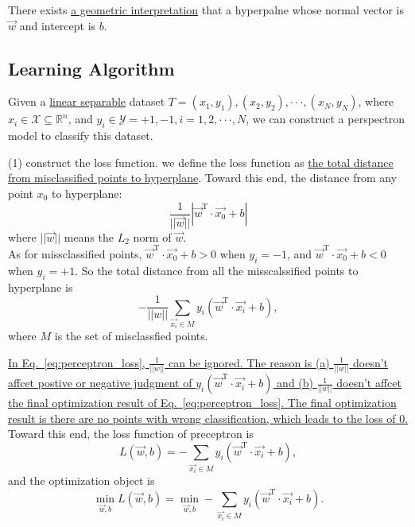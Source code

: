 \documentclass[10pt,onecolumn]{book}
\begin{document}
There exists \uline{a geometric interpretation} that a hyperpalne whose normal vector is $\vec{w}$ and intercept is $b$.

\subsection{Learning Algorithm}
Given a \uline{linear separable} dataset $T = {(x_{1}, y_{1}), (x_{2}, y_{2}), \cdot \cdot \cdot, (x_{N}, y_{N})}$, where $x_{i} \in \mathcal{X} \subseteq \mathbb{R}^n$, and $y_{i} \in \mathcal{Y} = {+1, -1}, i = 1, 2, \cdot \cdot \cdot, N$, we can construct a perspectron model to classify this dataset. 

(1) construct the loss function. we define the loss function as \uline{the total distance from misclassified points to hyperplane}. Toward this end, the distance from any point $x_{0}$ to hyperplane:
\begin{equation}
\frac{1}{||\vec{w}||} |\vec{w}^\mathrm{T}  \cdot \vec{x_{0}} + b|
\end{equation}
where ${||\vec{w}||}$ means the $L_{2}$ norm of $\vec{w}$.\\
\indent As for missclassified points, $\vec{w}^\mathrm{T}  \cdot \vec{x_{0}} + b > 0$ when $y_{i}=-1$, and $\vec{w}^\mathrm{T}  \cdot \vec{x_{0}} + b < 0$ when $y_{i}=+1$. So the total distance from all the misscalssified points to hyperplane is 
\begin{equation}\label{eq:perceptron_loss}
-\frac{1}{||w||}\sum_{\vec{x_{i}} \in M} y_{i} (\vec{w}^\mathrm{T}  \cdot \vec{x_{i}} + b),
\end{equation}
where $M$ is the set of misclassfied points.

\indent \uline{In Eq.~\ref{eq:perceptron_loss}, $\frac{1}{||w||}$ can be ignored. The reason is (a) $\frac{1}{||w||}$ doesn't affcet postive or negative judgment of $y_{i} (\vec{w}^\mathrm{T}  \cdot \vec{x_{i}} + b)$ and (b) $\frac{1}{||w||}$ doesn't affcet the final optimization result of Eq.~\ref{eq:perceptron_loss}. The final optimization result is there are no points with wrong classification, which leads to the loss of 0.} Toward this end, the loss function of preceptron is 
\begin{equation}\label{eq:perceptron_loss}
L(\vec{w}, b) = - \sum_{\vec{x_{i}} \in M} y_{i} (\vec{w}^\mathrm{T}  \cdot \vec{x_{i}} + b),
\end{equation}
and the optimization object is 
\begin{equation}\label{eq:perceptron_loss}
\min_{\vec{w}, b}L(\vec{w}, b) = \min_{\vec{w}, b}- \sum_{\vec{x_{i}} \in M} y_{i} (\vec{w}^\mathrm{T}  \cdot \vec{x_{i}} + b).
\end{equation}
\end{document}
